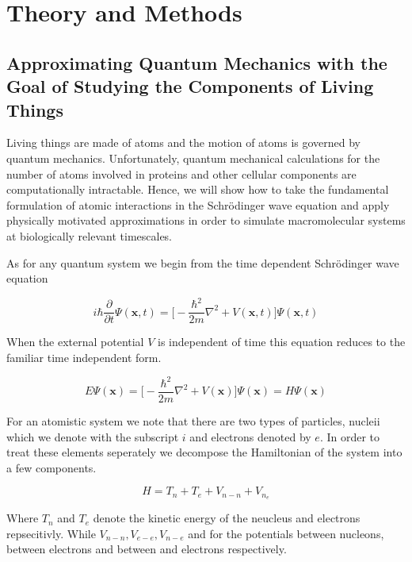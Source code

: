 \chapter{Theory and Methods}
\label{chap:methods}

\section{Approximating Quantum Mechanics with the Goal of Studying the Components of Living Things}
Living things are made of atoms and the motion of atoms is governed by quantum mechanics. Unfortunately, quantum mechanical calculations for the number of atoms involved in proteins and other cellular components are computationally intractable. Hence, we will show how to take the fundamental formulation of atomic interactions in the Schr\"{o}dinger wave equation and apply physically motivated approximations in order to simulate macromolecular systems at biologically relevant timescales. 

As for any quantum system we begin from the time dependent Schr\"{o}dinger wave equation 

\begin{equation}
i\hbar \frac {\partial}{\partial t} \Psi (\textbf{x},t) = \big[ -\frac{\hbar ^2}{2m}\nabla^2 + V (\textbf{x}, t) \big] \Psi (\textbf{x},t) 
\end{equation}

When the external potential $V$ is independent of time this equation reduces to the familiar time independent form. 

\begin{equation}
	E \Psi (\textbf{x}) = \big[ -\frac{\hbar ^2}{2m}\nabla^2 + V (\textbf{x}) \big] \Psi (\textbf{x}) = H \Psi(\textbf{x}) 
 \end{equation}

For an atomistic system we note that there are two types of particles, nucleii which we denote with the subscript $i$ and electrons denoted by $e$. In order to treat these elements seperately we decompose the Hamiltonian of the system into a few components. 

\begin {equation}
H = T_n + T_e + V_{n-n} + V_{n_e}
\end{equation}

Where $T_n$ and $T_e$ denote the kinetic energy of the neucleus and electrons repsecitivly. While $V_{n-n}, V_{e-e}, V_{n-e}$ and for the potentials between nucleons, between  electrons and between and electrons respectively.

